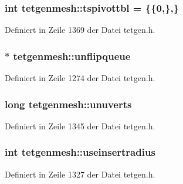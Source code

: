 \hypertarget{classtetgenmesh_a9b4b95dfdce4c8c1ae1b4e683bfeca5e}{
\subsubsection[{tspivottbl}]{\setlength{\rightskip}{0pt plus 5cm}int tetgenmesh\-::tspivottbl = \{\{0,\},\}\hspace{0.3cm}{\ttfamily [static]}}}\label{classtetgenmesh_a9b4b95dfdce4c8c1ae1b4e683bfeca5e}


Definiert in Zeile 1369 der Datei tetgen.\-h.

\hypertarget{classtetgenmesh_a7e5b4ac174203554e5d96fbc5a79c2bf}{
\subsubsection[{unflipqueue}]{$\ast$ tetgenmesh\-::unflipqueue}}\label{classtetgenmesh_a7e5b4ac174203554e5d96fbc5a79c2bf}


Definiert in Zeile 1274 der Datei tetgen.\-h.

\hypertarget{classtetgenmesh_a6207ea4c664732d18df4e1cb969f46f2}{
\subsubsection[{unuverts}]{\setlength{\rightskip}{0pt plus 5cm}long tetgenmesh\-::unuverts}}\label{classtetgenmesh_a6207ea4c664732d18df4e1cb969f46f2}


Definiert in Zeile 1345 der Datei tetgen.\-h.

\hypertarget{classtetgenmesh_a45386c7a807521fadc994a0be99df405}{
\subsubsection[{useinsertradius}]{\setlength{\rightskip}{0pt plus 5cm}int tetgenmesh\-::useinsertradius}}\label{classtetgenmesh_a45386c7a807521fadc994a0be99df405}


Definiert in Zeile 1327 der Datei tetgen.\-h.

